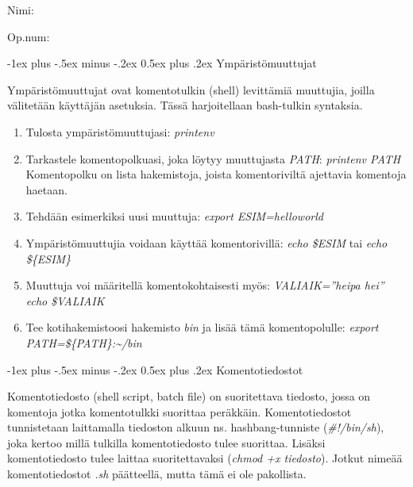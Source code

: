 \documentclass[12pt,portrait,a4]{article}
\makeatletter
\renewcommand{\section}{\@startsection{section}{1}{0mm}%
                                {-1ex plus -.5ex minus -.2ex}%
                                {0.5ex plus .2ex}%
                                {\normalfont\large\bfseries}}
\makeatother
\begin{document}
\raggedbottom

\begin{multicols}{2}
\setlength{\premulticols}{1pt}
\setlength{\postmulticols}{1pt}
\setlength{\multicolsep}{1pt}
\setlength{\columnsep}{2pt}

Nimi:\hrulefill

Op.num:\hrulefill

\end{multicols}

\section{Ympäristömuuttujat}

Ympäristömuuttujat ovat komentotulkin (shell) levittämiä muuttujia, joilla
välitetään käyttäjän asetuksia.  Tässä harjoitellaan bash-tulkin syntaksia.

\begin{enumerate}
\item Tulosta ympäristömuuttujasi: \emph{printenv}
\item Tarkastele komentopolkuasi, joka löytyy muuttujasta \emph{PATH}:
\emph{printenv PATH} \\
Komentopolku on lista hakemistoja, joista komentoriviltä ajettavia komentoja
haetaan.
\item Tehdään esimerkiksi uusi muuttuja: \emph{export ESIM=helloworld}
\item Ympäristömuuttujia voidaan käyttää komentorivillä: \emph{echo \$ESIM}
tai \emph{echo \$\{ESIM\}}
\item Muuttuja voi määritellä komentokohtaisesti myös: \emph{VALIAIK=''heipa
hei'' echo \$VALIAIK}
\item Tee kotihakemistoosi hakemisto \emph{bin} ja lisää tämä
komentopolulle: \emph{export PATH=\$\{PATH\}:\textasciitilde/bin}
\end{enumerate}

\section{Komentotiedostot}

Komentotiedosto (shell script, batch file) on suoritettava tiedosto, jossa
on komentoja jotka komentotulkki suorittaa peräkkäin.  Komentotiedostot
tunnistetaan laittamalla tiedoston alkuun ns. hashbang-tunniste 
(\emph{\#!/bin/sh}), joka kertoo millä tulkilla komentotiedosto tulee
suorittaa.  Lisäksi komentotiedosto tulee laittaa suoritettavaksi
(\emph{chmod +x tiedosto}).  Jotkut nimeää komentotiedostot \emph{.sh}
päätteellä, mutta tämä ei ole pakollista.
\end{document}
